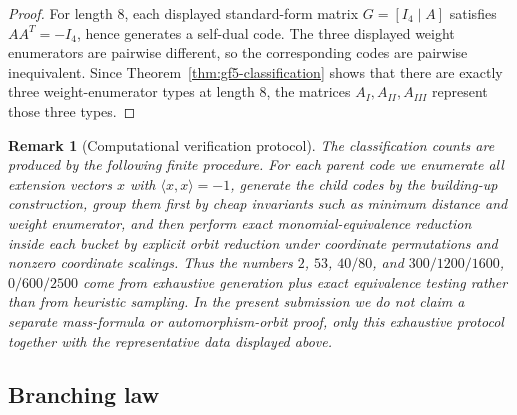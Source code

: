 \documentclass[12pt]{article}
\newtheorem{remark}[theorem]{Remark}
\newenvironment{blueblock}{\begingroup\color{blue}}{\endgroup}
\begin{document}
\begin{blueblock}
\begin{proof}
For length $8$, each displayed standard-form matrix $G=[I_4\mid A]$ satisfies $AA^T=-I_4$, hence generates a self-dual code. The three displayed weight enumerators are pairwise different, so the corresponding codes are pairwise inequivalent. Since Theorem~\ref{thm:gf5-classification} shows that there are exactly three weight-enumerator types at length $8$, the matrices $A_I,A_{II},A_{III}$ represent those three types.
\end{proof}

\begin{remark}[Computational verification protocol]
\label{rem:gf5-protocol}
The classification counts are produced by the following finite procedure. For each parent code we enumerate all extension vectors $x$ with $\langle x,x\rangle=-1$, generate the child codes by the building-up construction, group them first by cheap invariants such as minimum distance and weight enumerator, and then perform exact monomial-equivalence reduction inside each bucket by explicit orbit reduction under coordinate permutations and nonzero coordinate scalings. Thus the numbers $2$, $53$, $40/80$, and $300/1200/1600$, $0/600/2500$ come from exhaustive generation plus exact equivalence testing rather than from heuristic sampling. In the present submission we do not claim a separate mass-formula or automorphism-orbit proof, only this exhaustive protocol together with the representative data displayed above.
\end{remark}
\end{blueblock}

\subsection{Branching law}
\end{document}
